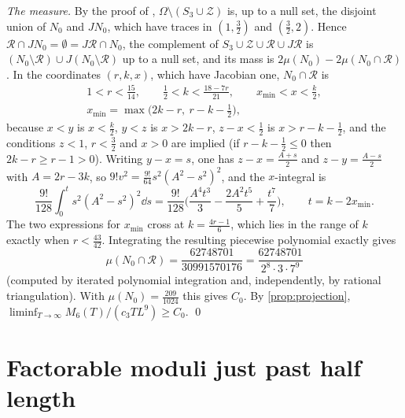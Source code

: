 \documentclass[11pt,colorlinks]{charlie}
\newcommand{\Om}{\Omega}
\begin{document}
\emph{The measure.} By the proof of , $\Om\setminus(S_3\cup\mathcal Z)$ is, up to a null set, the disjoint union of $N_0$ and $JN_0$, which have traces in $(1,\frac32)$ and $(\frac32,2)$. Hence $\mathcal R\cap JN_0=\emptyset=J\mathcal R\cap N_0$, the complement of $S_3\cup\mathcal Z\cup\mathcal R\cup J\mathcal R$ is $(N_0\setminus\mathcal R)\cup J(N_0\setminus\mathcal R)$ up to a null set, and its mass is $2\mu(N_0)-2\mu(N_0\cap\mathcal R)$. In the coordinates $(r,k,x)$, which have Jacobian one, $N_0\cap\mathcal R$ is
\begin{gather*}
 1<r<\tfrac{15}{14},\qquad\tfrac12<k<\tfrac{18-7r}{21},\qquad x_{\min}<x<\tfrac k2,\\
 x_{\min}=\max\big(2k-r,\ r-k-\tfrac12\big),
\end{gather*}
because $x<y$ is $x<\frac k2$, $y<z$ is $x>2k-r$, $z-x<\frac12$ is $x>r-k-\frac12$, and the conditions $z<1$, $r<\frac32$ and $x>0$ are implied (if $r-k-\frac12\le0$ then $2k-r\ge r-1>0$). Writing $y-x=s$, one has $z-x=\frac{A+s}2$ and $z-y=\frac{A-s}2$ with $A=2r-3k$, so $9!v^2=\frac{9!}{64}s^2(A^2-s^2)^2$, and the $x$-integral is
\[
 \frac{9!}{128}\int_0^t s^2(A^2-s^2)^2\dd s=\frac{9!}{128}\Big(\frac{A^4t^3}3-\frac{2A^2t^5}5+\frac{t^7}7\Big),\qquad t=k-2x_{\min}.
\]
The two expressions for $x_{\min}$ cross at $k=\frac{4r-1}6$, which lies in the range of $k$ exactly when $r<\frac{43}{42}$. Integrating the resulting piecewise polynomial exactly gives
\[
 \mu(N_0\cap\mathcal R)=\frac{62748701}{30991570176}=\frac{62748701}{2^8\cdot3\cdot7^9}
\]
(computed by iterated polynomial integration and, independently, by rational triangulation). With $\mu(N_0)=\frac{209}{1024}$ this gives $C_0$. By \cref{prop:projection}, $\liminf_{T\to\infty}M_6(T)/(c_3TL^9)\ge C_0$. \qed

\section{Factorable moduli just past half length}\label{sec:factorable}
\end{document}
